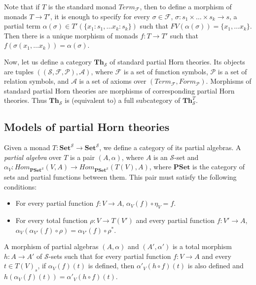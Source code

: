 \documentclass{elsarticle}
\theoremstyle{definition}
\theoremstyle{remark}
\newcommand{\cat}[1]{\mathbf{#1}}
\newcommand{\Set}{\cat{Set}}
\newcommand{\PSet}{\cat{PSet}}
\newcommand{\Th}{\cat{Th}}
\numberwithin{figure}{section}
\begin{document}
Note that if $T$ is the standard monad $Term_\mathcal{F}$, then to define a morphism of monads $T \to T'$,
    it is enough to specify for every $\sigma \in \mathcal{F}$, $\sigma : s_1 \times \ldots \times s_k \to s$,
    a partial term $\alpha(\sigma) \in T'(\{ x_1 : s_1, \ldots x_k : s_k \})$ such that $FV(\alpha(\sigma)) = \{ x_1, \ldots x_k \}$.
Then there is a unique morphism of monads $f : T \to T'$ such that $f(\sigma(x_1, \ldots x_k)) = \alpha(\sigma)$.

Now, let us define a category $\Th_\mathcal{S}$ of standard partial Horn theories.
Its objects are tuples $((\mathcal{S},\mathcal{F},\mathcal{P}),\mathcal{A})$, where $\mathcal{F}$ is a set of function symbols,
    $\mathcal{P}$ is a set of relation symbols, and $\mathcal{A}$ is a set of axioms over $(Term_\mathcal{F},Form_\mathcal{P})$.
Morphisms of standard partial Horn theories are morphisms of corresponding partial Horn theories.
Thus $\Th_\mathcal{S}$ is (equivalent to) a full subcategory of $\Th^T_\mathcal{S}$.

\subsection{Models of partial Horn theories}

Given a monad $T : \Set^\mathcal{S} \to \Set^\mathcal{S}$, we define a category of its partial algebras.
A \emph{partial algebra} over $T$ is a pair $(A,\alpha)$, where $A$ is an $\mathcal{S}$-set and $\alpha_V : Hom_{\PSet^\mathcal{S}}(V,A) \to Hom_{\PSet^\mathcal{S}}(T(V),A)$,
    where $\PSet$ is the category of sets and partial functions between them.
This pair must satisfy the following conditions:
\begin{itemize}
\item For every partial function $f : V \to A$, $\alpha_V(f) \circ \eta_V = f$.
\item For every total function $\rho : V \to T(V')$ and every partial function $f : V' \to A$, $\alpha_V(\alpha_{V'}(f) \circ \rho) = \alpha_{V'}(f) \circ \rho^*$.
\end{itemize}
A morphism of partial algebras $(A,\alpha)$ and $(A',\alpha')$ is a total morphism $h : A \to A'$ of $\mathcal{S}$-sets
    such that for every partial function $f : V \to A$ and every $t \in T(V)_s$, if $\alpha_V(f)(t)$ is defined,
    then $\alpha'_V(h \circ f)(t)$ is also defined and $h(\alpha_V(f)(t)) = \alpha'_V(h \circ f)(t)$.
\end{document}
